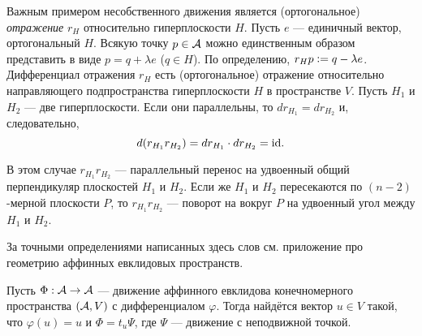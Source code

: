 \begin{example}
    Важным примером несобственного движения является (ортогональное) \textit{отражение} $r_H$ относительно гиперплоскости $H$. Пусть $e$ --- единичный вектор, ортогональный $H$. Всякую точку $p \in \mathcal{A}$ можно единственным образом представить в виде $p = q + \lambda e$ ($q \in H$). По определению, $r_Hp \vcentcolon = q - \lambda e$. Дифференциал отражения $r_H$ есть (ортогональное) отражение относительно направляющего подпространства гиперплоскости $H$ в пространстве $V$. Пусть $H_1$ и $H_2$ --- две гиперплоскости. Если они параллельны, то $dr_{H_1} = dr_{H_2}$ и, следовательно,
    \[
        d(r_{H_1}r_{H_2}) = dr_{H_1} \cdot dr_{H_2} = \mathrm{id}.
    \]

    В этом случае $r_{H_1}r_{H_2}$ --- параллельный перенос на удвоенный общий перпендикуляр плоскостей $H_1$ и $H_2$. Если же $H_1$ и $H_2$ пересекаются по $(n - 2)$-мерной плоскости $P$, то $r_{H_1}r_{H_2}$ --- поворот на вокруг $P$ на удвоенный угол между $H_1$ и $H_2$.

    За точными определениями написанных здесь слов см. приложение про геометрию аффинных евклидовых пространств.
\end{example}

\begin{theorem}
    Пусть $\Phi: \mathcal{A} \to \mathcal{A}$ --- движение аффинного евклидова конечномерного пространства $(\mathcal{A}, V)$ с дифференциалом $\varphi$. Тогда найдётся вектор $u \in V$ такой, что $\varphi(u) = u$ и $\Phi = t_u\Psi$, где $\Psi$ --- движение с неподвижной точкой.
\end{theorem}

